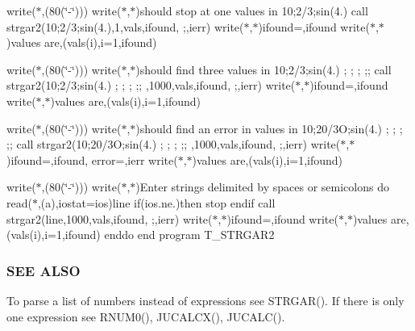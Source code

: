 write($\ast$,\textquotesingle{}(80(\char`\"{}-\/\char`\"{}))\textquotesingle{}) write($\ast$,$\ast$)\textquotesingle{}should stop at one values in 10;2/3;sin(4.)\textquotesingle{} call strgar2(\textquotesingle{}10;2/3;sin(4.)\textquotesingle{},1,vals,ifound,\textquotesingle{} ;\textquotesingle{},ierr) write($\ast$,$\ast$)\textquotesingle{}ifound=\textquotesingle{},ifound write($\ast$,$\ast$)\textquotesingle{}values are\textquotesingle{},(vals(i),i=1,ifound)

write($\ast$,\textquotesingle{}(80(\char`\"{}-\/\char`\"{}))\textquotesingle{}) write($\ast$,$\ast$)\textquotesingle{}should find three values in 10;2/3;sin(4.) ; ; ; ;; \textquotesingle{} call strgar2(\textquotesingle{}10;2/3;sin(4.) ; ; ; ;; \textquotesingle{},1000,vals,ifound,\textquotesingle{} ;\textquotesingle{},ierr) write($\ast$,$\ast$)\textquotesingle{}ifound=\textquotesingle{},ifound write($\ast$,$\ast$)\textquotesingle{}values are\textquotesingle{},(vals(i),i=1,ifound)

write($\ast$,\textquotesingle{}(80(\char`\"{}-\/\char`\"{}))\textquotesingle{}) write($\ast$,$\ast$)\textquotesingle{}should find an error in values in 10;20/3O;sin(4.) ; ; ; ;; \textquotesingle{} call strgar2(\textquotesingle{}10;20/3O;sin(4.) ; ; ; ;; \textquotesingle{},1000,vals,ifound,\textquotesingle{} ;\textquotesingle{},ierr) write($\ast$,$\ast$)\textquotesingle{}ifound=\textquotesingle{},ifound,\textquotesingle{} error=\textquotesingle{},ierr write($\ast$,$\ast$)\textquotesingle{}values are\textquotesingle{},(vals(i),i=1,ifound)

write($\ast$,\textquotesingle{}(80(\char`\"{}-\/\char`\"{}))\textquotesingle{}) write($\ast$,$\ast$)\textquotesingle{}Enter strings delimited by spaces or semicolons\textquotesingle{} do read($\ast$,\textquotesingle{}(a)\textquotesingle{},iostat=ios)line if(ios.\+ne.)then stop endif call strgar2(line,1000,vals,ifound,\textquotesingle{} ;\textquotesingle{},ierr) write($\ast$,$\ast$)\textquotesingle{}ifound=\textquotesingle{},ifound write($\ast$,$\ast$)\textquotesingle{}values are\textquotesingle{},(vals(i),i=1,ifound) enddo end program T\+\_\+\+S\+T\+R\+G\+A\+R2

\subsubsection*{S\+EE A\+L\+SO}

\begin{DoxyVerb} To parse a list of numbers instead of expressions see STRGAR().
 If there is only one expression see RNUM0(), JUCALCX(), JUCALC().
\end{DoxyVerb}


